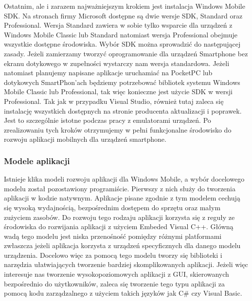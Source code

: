 Ostatnim, ale i zarazem najważniejszym krokiem jest instalacja Windows Mobile
SDK. Na stronach firmy Microsoft dostępne są dwie wersje SDK, Standard oraz
Professional. Wersja Standard zawiera w sobie tylko wsparcie dla urządzeń z
Windows Mobile Classic lub Standard natomiast wersja Professional obejmuje
wszystkie dostępne środowiska. Wybór SDK można sprowadzić do następującej
zasady. Jeżeli zamierzamy tworzyć oprogramowanie dla urządzeń Smartphone bez
ekranu dotykowego w zupełności wystarczy nam wersja standardowa. Jeżeli
natomiast planujemy napisane aplikacje uruchamiać na PocketPC lub dotykowych
SmartPhon'ach będziemy potrzebować bibliotek systemu Windows Mobile Classic lub
Professional, tak więc konieczne jest użycie SDK w wersji Professional. Tak jak
w przypadku Visual Studio, również tutaj zaleca się instalację wszystkich
dostępnych na stronie producenta aktualizacji i poprawek. Jest to szczególnie
istotne podczas pracy z emulatorami urządzeń. Po zrealizowaniu tych kroków
otrzymujemy w pełni funkcjonalne środowisko do rozwoju aplikacji mobilnych dla
urządzeń smartphone.

\subsubsection{Modele aplikacji}
Istnieje klika modeli rozwoju aplikacji dla Windows Mobile, a wybór docelowego
modelu został pozostawiony programiście. Pierwszy z nich służy do tworzenia
aplikacji w kodzie natywnym. Aplikacje pisane zgodnie z tym modelem cechują się
wysoką wydajnością, bezpośrednim dostępem do sprzętu oraz małym zużyciem
zasobów. Do rozwoju tego rodzaju aplikacji korzysta się z reguły ze środowiska do
rozwijania aplikacji z użyciem Embeded Visual C++. Główną wadą tego modelu jest
niska przenośność pomiędzy różnymi platformami zwłaszcza jeżeli aplikacja
korzysta z urządzeń specyficznych dla danego modelu urządzenia. Docelowo więc za
pomocą tego modelu tworzy się biblioteki i narzędzia ułatwiających tworzenie
bardziej skomplikowanych aplikacji. Jeżeli więc interesuje nas tworzenie
wysokopoziomowych aplikacji z GUI, skierowanych bezpośrednio do użytkowników,
zaleca się tworzenie tego typu aplikacji za pomocą kodu zarządzalnego z użyciem
takich języków jak C\# czy Visual Basic. 

